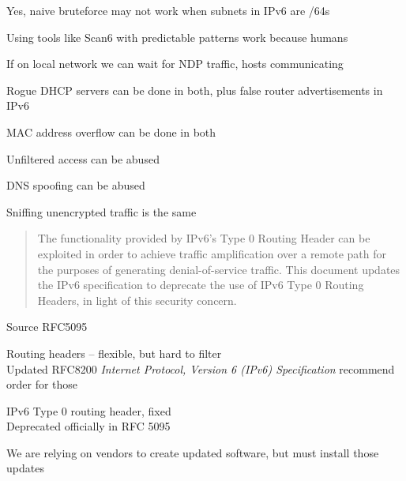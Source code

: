 \documentclass[Screen16to9,17pt]{foils}
\begin{document}

\begin{list2}
\item Yes, naive bruteforce may not work when subnets in IPv6 are /64s
\item Using tools like Scan6 with predictable patterns work because humans
\item If on local network we can wait for NDP traffic, hosts communicating
\end{list2}




\begin{list2}
\item Rogue DHCP servers can be done in both, plus false router advertisements in IPv6
\item MAC address overflow can be done in both
\item Unfiltered access can be abused
\item DNS spoofing can be abused
\item Sniffing unencrypted traffic is the same
\end{list2}



\begin{quote}
The functionality provided by IPv6's Type 0 Routing Header can be exploited in order to achieve traffic amplification over a remote path for the purposes of generating denial-of-service traffic.  This document updates the IPv6 specification to deprecate the use of IPv6 Type 0 Routing Headers, in light of this security concern.
\end{quote}
Source RFC5095


\begin{list2}
\item Routing headers -- flexible, but hard to filter\\
Updated RFC8200 \emph{Internet Protocol, Version 6 (IPv6) Specification} recommend order for those
\item IPv6 Type 0 routing header, fixed\\
Deprecated officially in RFC 5095 
\end{list2}

We are relying on vendors to create updated software, but must install those updates
\end{document}
